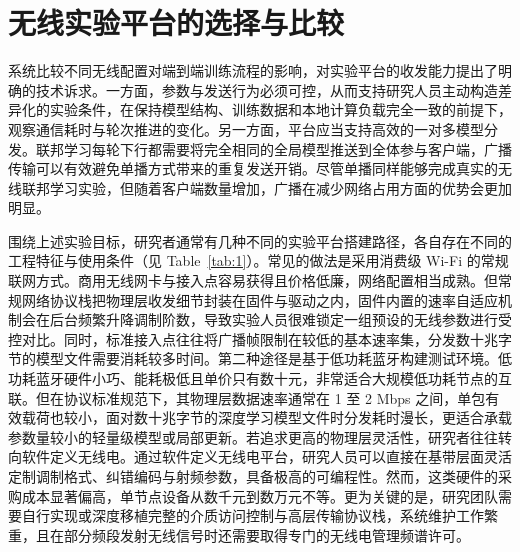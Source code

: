 \section{无线实验平台的选择与比较}
\label{sec:2}

系统比较不同无线配置对端到端训练流程的影响，对实验平台的收发能力提出了明确的技术诉求。一方面，参数与发送行为必须可控，从而支持研究人员主动构造差异化的实验条件，在保持模型结构、训练数据和本地计算负载完全一致的前提下，观察通信耗时与轮次推进的变化。另一方面，平台应当支持高效的一对多模型分发。联邦学习每轮下行都需要将完全相同的全局模型推送到全体参与客户端，广播传输可以有效避免单播方式带来的重复发送开销。尽管单播同样能够完成真实的无线联邦学习实验，但随着客户端数量增加，广播在减少网络占用方面的优势会更加明显。

围绕上述实验目标，研究者通常有几种不同的实验平台搭建路径，各自存在不同的工程特征与使用条件（见 Table~\ref{tab:1}）。常见的做法是采用消费级 Wi-Fi 的常规联网方式。商用无线网卡与接入点容易获得且价格低廉，网络配置相当成熟。但常规网络协议栈把物理层收发细节封装在固件与驱动之内，固件内置的速率自适应机制会在后台频繁升降调制阶数，导致实验人员很难锁定一组预设的无线参数进行受控对比。同时，标准接入点往往将广播帧限制在较低的基本速率集，分发数十兆字节的模型文件需要消耗较多时间。第二种途径是基于低功耗蓝牙构建测试环境。低功耗蓝牙硬件小巧、能耗极低且单价只有数十元，非常适合大规模低功耗节点的互联。但在协议标准规范下，其物理层数据速率通常在 1 至 2 Mbps 之间，单包有效载荷也较小，面对数十兆字节的深度学习模型文件时分发耗时漫长，更适合承载参数量较小的轻量级模型或局部更新。若追求更高的物理层灵活性，研究者往往转向软件定义无线电。通过软件定义无线电平台，研究人员可以直接在基带层面灵活定制调制格式、纠错编码与射频参数，具备极高的可编程性。然而，这类硬件的采购成本显著偏高，单节点设备从数千元到数万元不等。更为关键的是，研究团队需要自行实现或深度移植完整的介质访问控制与高层传输协议栈，系统维护工作繁重，且在部分频段发射无线信号时还需要取得专门的无线电管理频谱许可。



